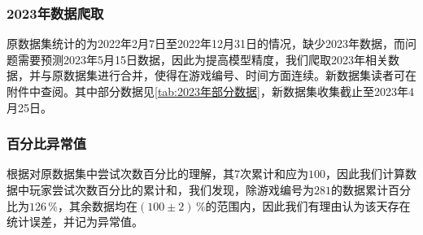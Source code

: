 \documentclass{MathModeling}
\begin{document}
	\subsubsection{2023年数据爬取}
	原数据集统计的为2022年2月7日至2022年12月31日的情况，缺少2023年数据，而问题需要预测2023年5月15日数据，因此为提高模型精度，我们爬取2023年相关数据，并与原数据集进行合并，使得在游戏编号、时间方面连续。新数据集读者可在附件中查阅。其中部分数据见\textcolor{blue}{\cref{tab:2023年部分数据}}，新数据集收集截止至2023年4月25日。
\begin{table}[H]
	\centering
	\caption{2023年部分数据}
	\label{tab:2023年部分数据}
\end{table}

	\subsubsection{百分比异常值}
	根据对原数据集中尝试次数百分比的理解，其7次累计和应为$100$，因此我们计算数据中玩家尝试次数百分比的累计和，我们发现，除游戏编号为$281$的数据累计百分比为$126\,\%$，其余数据均在$\left(100\pm2\right)\,\%$的范围内，因此我们有理由认为该天存在统计误差，并记为异常值。
\end{document}
